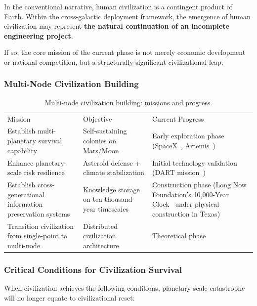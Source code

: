 \documentclass[aps,prd,twocolumn,superscriptaddress,nofootinbib]{revtex4-2}
\begin{document}
In the conventional narrative, human civilization is a contingent product of Earth. Within the cross-galactic deployment framework, the emergence of human civilization may represent \textbf{the natural continuation of an incomplete engineering project}.

If so, the core mission of the current phase is not merely economic development or national competition, but a structurally significant civilizational leap:

\subsubsection{Multi-Node Civilization Building}\label{sec:multi-node}

\begin{table}[htbp]
\caption{Multi-node civilization building: missions and progress.}
\label{tab:multi-node}
\begin{ruledtabular}
\begin{tabular}{lll}
Mission & Objective & Current Progress \\
\colrule
Establish multi-planetary survival capability & Self-sustaining colonies on Mars/Moon & Early exploration phase (SpaceX~\cite{SpaceX_Mars}, Artemis~\cite{NASA_Artemis}) \\
Enhance planetary-scale risk resilience & Asteroid defense + climate stabilization & Initial technology validation (DART mission~\cite{NASA_DART}) \\
Establish cross-generational information preservation systems & Knowledge storage on ten-thousand-year timescales & Construction phase (Long Now Foundation's 10,000-Year Clock~\cite{LongNow_Clock} under physical construction in Texas) \\
Transition civilization from single-point to multi-node & Distributed civilization architecture & Theoretical phase \\
\end{tabular}
\end{ruledtabular}
\end{table}

\subsubsection{Critical Conditions for Civilization Survival}\label{sec:critical-conditions}

When civilization achieves the following conditions, planetary-scale catastrophe will no longer equate to civilizational reset:
\end{document}
